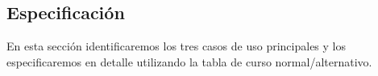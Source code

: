\documentclass{article}
\theoremstyle{definition}
\theoremstyle{remark}
\begin{document}
\subsection{Especificación}

\newcommand{\curef}[1]{\textbf{Caso de uso \ref{cu:#1}}}
\newcommand{\cutitle}[1]{\renewcommand{\givencutitle}{#1}}
\newcommand{\cuactors}[1]{\renewcommand{\givencuactors}{#1}}
\newcommand{\cupre}[1]{\renewcommand{\givencupre}{#1}}
\newcommand{\cupost}[1]{\renewcommand{\givencupost}{#1}}
\newcommand{\cucourse}[1]{\renewcommand{\givencucourse}{#1}}
\newcommand{\culabel}[1]{\renewcommand{\givenculabel}{#1}}
\newcommand{\cucaption}[1]{\renewcommand{\givencucaption}{#1}}
\newcommand{\givencutitle}{REQUIRED!}
\newcommand{\givencuactors}{REQUIRED!}
\newcommand{\givencupre}{-}
\newcommand{\givencupost}{-}
\newcommand{\givencucourse}{REQUIRED!}
\newcommand{\givenculabel}{REQUIRED!}
\newcommand{\givencucaption}{} %

\newenvironment{casodeuso}
{\begin{table}[H]}{%
\begin{tabular}{|p{0.5\linewidth} p{0.5\linewidth}|}\hline
\multicolumn{2}{|l|}{\textbf{Caso de Uso: \ref{cu:\givenculabel}) \givencutitle}} \\
\multicolumn{2}{|l|}{\textbf{Actor:} \givencuactors} \\
\multicolumn{2}{|l|}{\textbf{Pre:} \givencupre} \\
\multicolumn{2}{|l|}{\textbf{Post:} \givencupost} \\
\vspace{1px}\textbf{Curso Normal} & \vspace{1px}\textbf{Curso Alternativo} \\
\givencucourse
\hline
\end{tabular}
\caption{\givencutitle}
\label{cu:\givenculabel}
\end{table}}

En esta sección identificaremos los tres casos de uso principales y los especificaremos en detalle utilizando la tabla de curso normal/alternativo.
\end{document}
